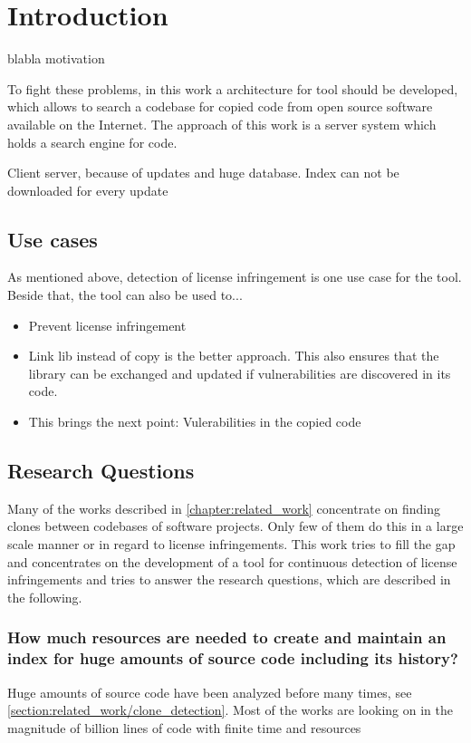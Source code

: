 
\chapter{Introduction}\label{chapter:introduction}
blabla motivation

To fight these problems, in this work a architecture for tool should be developed, which allows to search a codebase for copied code from open source software available on the Internet.
The approach of this work is a server system which holds a search engine for code.

Client server, because of updates and huge database. Index can not be downloaded for every update


\section{Use cases}\label{section:introduction/use_cases}
As mentioned above, detection of license infringement is one use case for the tool.
Beside that, the tool can also be used to...
\begin{itemize}
	\item Prevent license infringement
	\item Link lib instead of copy is the better approach. This also ensures that the library can be exchanged and updated if vulnerabilities are discovered in its code.
	\item This brings the next point: Vulerabilities in the copied code
\end{itemize}

\section{Research Questions}\label{section:introduction/research_questions}
Many of the works described in \autoref{chapter:related_work} concentrate on finding clones between codebases of software projects.
Only few of them do this in a large scale manner or in regard to license infringements.
This work tries to fill the gap and concentrates on the development of a tool for continuous detection of license infringements and tries to answer the research questions, which are described in the following.

\subsection*{How much resources are needed to create and maintain an index for huge amounts of source code including its history?}
Huge amounts of source code have been analyzed before many times, see \ref{section:related_work/clone_detection}.
Most of the works are looking on 
 in the magnitude of billion lines of code 
 with finite time and resources

